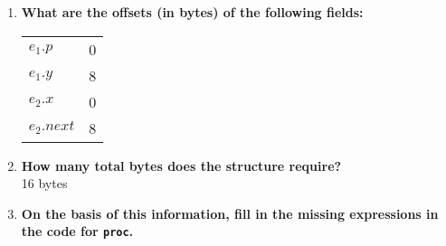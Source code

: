 \documentclass{article}
\begin{document}
\begin{enumerate}[label=\textbf{\Alph*.}]
	\item \textbf{What are the offsets (in bytes) of the following fields:} \\
	\begin{tabular}{l l}
	\texttt{$e_1.p$} & 0 \\
	\texttt{$e_1.y$} & 8 \\
	\texttt{$e_2.x$} & 0 \\
	\texttt{$e_2.next$} & 8
	\end{tabular}
	\item \textbf{How many total bytes does the structure require?} \\
	16 bytes
	\item \textbf{On the basis of this information, fill in the missing expressions in
	the code for \texttt{proc}.} \\
\end{enumerate}
\end{document}

